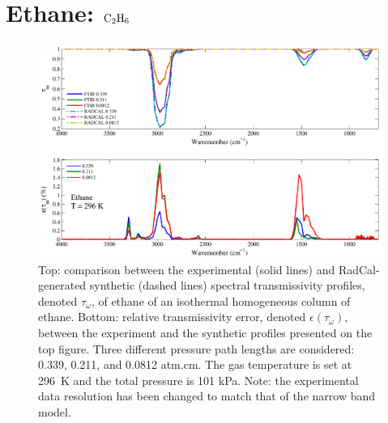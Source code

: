 \clearpage

\section{Ethane: $\rm C_2H_6$}

\begin{figure}[h]
\includegraphics[width=\textwidth]{../Verification/Results_Test2/Ethane_296.pdf}
\caption{Top: comparison between the experimental (solid lines) and RadCal-generated synthetic (dashed lines) spectral transmissivity profiles, denoted $\tau_{\omega}$, of ethane of an isothermal homogeneous column of ethane. Bottom: relative transmissivity error, denoted $\epsilon{(\tau_{\omega})}$, between the experiment and the synthetic profiles presented on the top figure. Three different pressure path lengths are considered: 0.339, 0.211, and 0.0812 atm.cm. The gas temperature is set at 296~K and the total pressure is 101 kPa. Note: the experimental data resolution has been changed to match that of the narrow band model. \label{fig:ethane_Verify_296K}}
\end{figure}

\newpage

